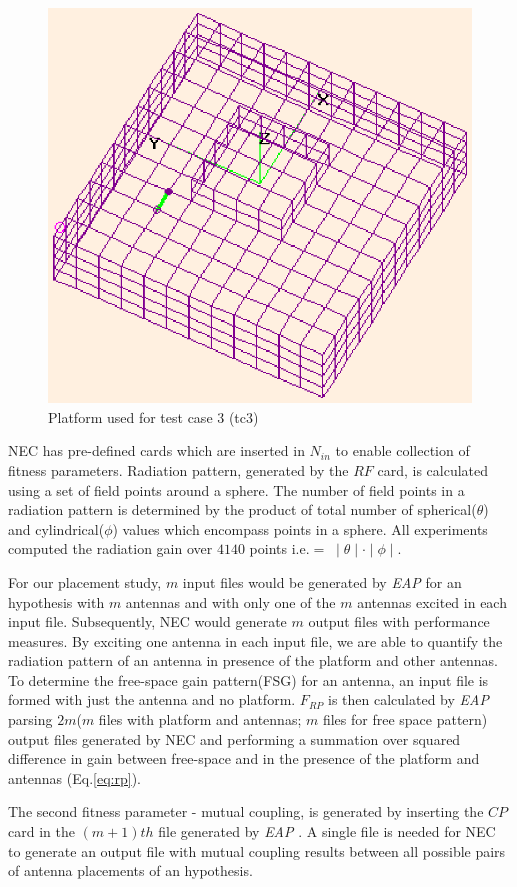 \documentclass{sig-alternate}
\begin{document}
\begin{figure}
    \begin{center}
        \includegraphics[width=.41\textwidth]{FIG/s5}
\end{center}
\caption{Platform used for test case 3 (tc3)}
\label{fig:plat3}
\end{figure}

NEC has pre-defined cards which are inserted in $N_{in}$ to enable collection of fitness parameters. Radiation pattern, generated by the $RF$ card, is calculated using a set of field points around a sphere. The number of field points in a radiation pattern is determined by the product of total number of spherical($\theta$) and cylindrical($\phi$) values which encompass points in a sphere. All experiments computed the radiation gain over $4140$ points i.e.$ = \; \mid \theta \mid \cdot \mid \phi \mid$.

For our placement study, $m$ input files would be generated by \textit{EAP} for an hypothesis with $m$ antennas and with only one of the $m$ antennas excited in each input file. Subsequently, NEC would generate $m$ output files with performance measures. By exciting one antenna in each input file, we are able to quantify the radiation pattern of an antenna in presence of the platform and other antennas. To determine the free-space gain pattern(FSG) for an antenna, an input file is formed with just the antenna and no platform. $F_{RP}$ is then calculated by \textit{EAP} parsing $2m$($m$ files with platform and antennas; $m$ files for free space pattern) output files generated by NEC and performing a summation over squared difference in gain between free-space and in the presence of the platform and antennas (Eq.\eqref{eq:rp}).

The second fitness parameter - mutual coupling, is generated by inserting the $CP$ card in the $(m+1)th$ file generated by \textit{EAP} . A single file is needed for NEC to generate an output file with mutual coupling results between all possible pairs of antenna placements of an hypothesis.
\end{document}
